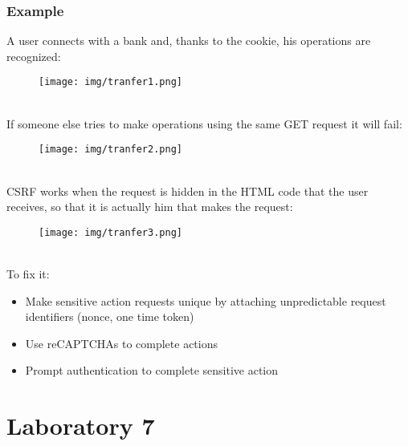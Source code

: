 \documentclass[a4paper, 10pt, titlepage]{article}
\begin{document}
\subsubsection*{Example}
A user connects with a bank and, thanks to the cookie, his operations are recognized:
\begin{figure}[h]
\centering
\texttt{[image: img/tranfer1.png]}
\end{figure}\\
If someone else tries to make operations using the same GET request it will fail:
\begin{figure}[h]
\centering
\texttt{[image: img/tranfer2.png]}
\end{figure}\\
CSRF works when the request is hidden in the HTML code that the user receives, so that it is actually him that makes the request:
\begin{figure}[h]
\centering
\texttt{[image: img/tranfer3.png]}
\end{figure} \\
To fix it:
\begin{itemize}
\item Make sensitive action requests unique by attaching unpredictable request identifiers (nonce, one time token)
\item Use reCAPTCHAs to complete actions
\item Prompt authentication to complete sensitive action
\end{itemize}

\newpage
\section{Laboratory 7}
\end{document}
